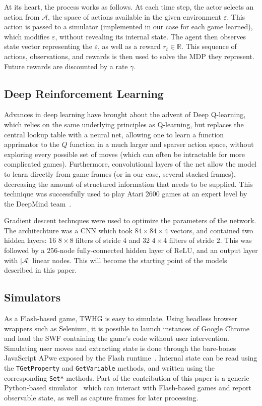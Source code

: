 \documentclass[12pt]{article}
\begin{document}
At its heart, the process works as follows. At each time step, the actor selects an action from $\mathcal{A}$, the space of actions available in the given environment $\varepsilon$. This action is passed to a simulator (implemented in our case for each game learned), which modifies $\varepsilon$, without revealing its internal state. The agent then observes state vector representing the $\varepsilon$, as well as a reward $r_t \in \mathbb{R}$. This sequence of actions, observations, and rewards is then used to solve the MDP they represent. Future rewards are discounted by a rate $\gamma$.

\subsection{Deep Reinforcement Learning}

Advances in deep learning have brought about the advent of Deep Q-learning, which relies on the same underlying principles as Q-learning, but replaces the central lookup table with a neural net, allowing one to learn a function apprimator to the $Q$ function in a much larger and sparser action space, without exploring every possible set of moves (which can often be intractable for more complicated games). Furthermore, convolutional layers of the net allow the model to learn directly from game frames (or in our case, several stacked frames), decreasing the amount of structured information that needs to be supplied. This technique was successfully used to play Atari 2600 games at an expert level by the DeepMind team~\cite{deepmind}.

Gradient descent technques were used to optimize the parameters of the network. The architechture was a CNN which took $84 \times 84 \times 4$ vectors, and contained two hidden layers: 16 $8 \times 8$ filters of stride $4$ and 32 $4 \times 4$ filters of stride $2$. This was followed by a 256-node fully-connected hidden layer of ReLU, and an output layer with $|\mathcal{A}|$ linear nodes. This will become the starting point of the models described in this paper.

\subsection{Simulators}

As a Flash-based game, TWHG is easy to simulate. Using headless browser wrappers such as Selenium, it is possible to launch instances of Google Chrome and load the SWF containing the game's code without user intervention. Simulating user moves and extracting state is done through the bare-bones JavaScript APwe exposed by the Flash runtime~\cite{flashjs}. Internal state can be read using the \texttt{TGetProperty} and \texttt{GetVariable} methods, and written using the corresponding \texttt{Set*} methods. Part of the contribution of this paper is a generic Python-based simulator~\cite{simulator} which can interact with Flash-based games and report observable state, as well as capture frames for later processing.
\end{document}
